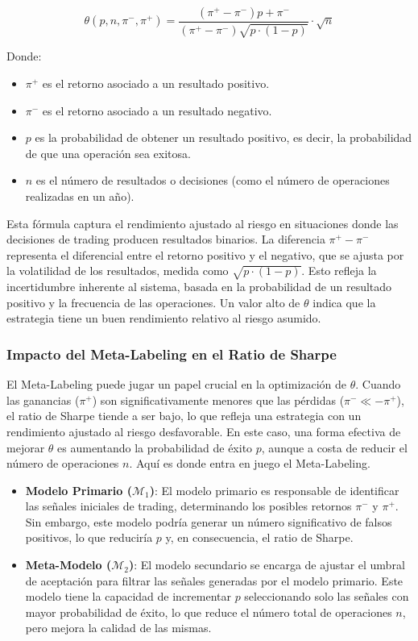 \documentclass[a4paper,12pt, twoside]{report}
\begin{document}
\[
\theta(p, n, \pi^-, \pi^+) = \frac{(\pi^+ - \pi^-) p + \pi^-}{(\pi^+ - \pi^-) \sqrt{p \cdot (1 - p)}} \cdot \sqrt{n}
\]

Donde:
\begin{itemize}
    \item $\pi^+$ es el retorno asociado a un resultado positivo.
    \item $\pi^-$ es el retorno asociado a un resultado negativo.
    \item $p$ es la probabilidad de obtener un resultado positivo, es decir, la 
    probabilidad de que una operación sea exitosa.
    \item $n$ es el número de resultados o decisiones (como el número de 
    operaciones realizadas en un año).
\end{itemize}

Esta fórmula captura el rendimiento ajustado al riesgo en situaciones donde las 
decisiones de trading producen resultados binarios. La diferencia $\pi^+ - \pi^-$ 
representa el diferencial entre el retorno positivo y el negativo, que se ajusta 
por la volatilidad de los resultados, medida como $\sqrt{p \cdot (1 - p)}$. Esto 
refleja la incertidumbre inherente al sistema, basada en la probabilidad de un 
resultado positivo y la frecuencia de las operaciones.
Un valor alto de $\theta$ indica que la estrategia tiene un buen rendimiento 
relativo al riesgo asumido.



\subsubsection{Impacto del Meta-Labeling en el Ratio de Sharpe}

El Meta-Labeling puede jugar un papel crucial en la optimización de $\theta$. Cuando 
las ganancias ($\pi^+$) son significativamente menores que las pérdidas ($\pi^- \ll -\pi^+$), 
el ratio de Sharpe tiende a ser bajo, lo que refleja una estrategia con un rendimiento 
ajustado al riesgo desfavorable. En este caso, una forma efectiva de 
mejorar $\theta$ es aumentando la probabilidad de éxito $p$, aunque a costa de 
reducir el número de operaciones $n$. Aquí es donde entra en juego el Meta-Labeling.

\begin{itemize}
    \item \textbf{Modelo Primario ($\mathcal{M}_1$)}: El modelo primario es responsable de identificar 
    las señales iniciales de trading, determinando los posibles retornos $\pi^-$ y $\pi^+$. Sin embargo, 
    este modelo podría generar un número significativo de falsos positivos, lo que reduciría $p$ y, en 
    consecuencia, el ratio de Sharpe.
    
    \item \textbf{Meta-Modelo ($\mathcal{M}_2$)}: El modelo secundario se encarga de ajustar el umbral 
    de aceptación para filtrar las señales generadas por el modelo primario. Este modelo tiene la 
    capacidad de incrementar $p$ seleccionando solo las señales con mayor probabilidad de éxito, 
    lo que reduce el número total de operaciones $n$, pero mejora la calidad de las mismas.
\end{itemize}
\end{document}
